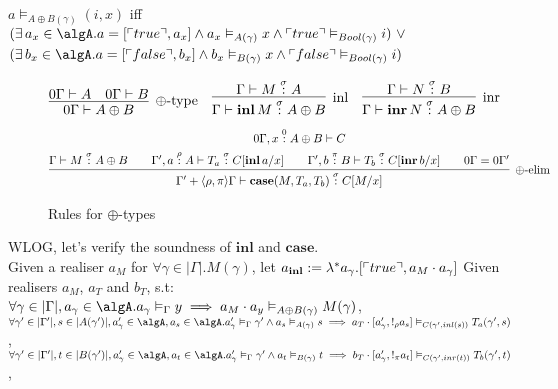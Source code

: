 \documentclass[12pt,a4paper]{article}
\begin{document}
$ a \vDash_{A \oplus B(\gamma)} (i , x)$ iff 
$\begin{aligned}
  &(\exists\, a_x \in \algA. a = [\ulcorner true \urcorner, a_x] \land a_x \vDash_{A(\gamma)} x \land \ulcorner true \urcorner \vDash_{Bool(\gamma)} i)\ \lor \\
  & (\exists\, b_x \in \algA. a = [\ulcorner false \urcorner, b_x] \land b_x \vDash_{B(\gamma)} x \land \ulcorner false \urcorner \vDash_{Bool(\gamma)} i) 
\end{aligned}$

\begin{figure}[h]
\begin{align*}
  \infer[\oplus\text{-type}]{0\Gamma \vdash A \oplus B}{
    0\Gamma \vdash A &
    0\Gamma \vdash B} & & 
  \infer[\text{inl}]{\Gamma \vdash \mathbf{inl}\, M \of \sigma A \oplus B}{
      \Gamma \vdash M \of{\sigma} A} & &
    \infer[\text{inr}]{\Gamma \vdash \mathbf{inr}\, N \of \sigma A \oplus B}{
      \Gamma \vdash N \of{\sigma} B
    }
  \end{align*}
  \begin{gather*}
  0\Gamma, x \of{0} A \oplus B \vdash C \\
  \infer[\oplus \text{-elim}]{\Gamma' + \langle\rho, \pi\rangle\Gamma \vdash \mathbf{case}(M, T_a, T_b) \of{\sigma} C[M / x]}{
    \Gamma \vdash M \of \sigma A \oplus B &&
    \Gamma', a \of {\rho} A \vdash T_a \of{\sigma} C[\mathbf{inl}\,a/x] && 
    \Gamma', b \of{\pi} B \vdash T_b \of{\sigma} C[\mathbf{inr}\, b/x] &&
    0\Gamma = 0\Gamma'
  }
  \end{gather*}
\caption{Rules for $\oplus$-types}
\end{figure}
WLOG, let's verify the soundness of $\mathbf{inl}$ and $\mathbf{case}$.\\
Given a realiser $a_M$ for $\forall \gamma \in |\Gamma|. M(\gamma)$, let $a_{\mathbf{inl}} := \lambda^* a_\gamma. [\ulcorner true \urcorner, a_M \cdot a_\gamma]$
\newpage
Given realisers $a_M$, $a_T$ and $b_T$, s.t:\\
$\forall \gamma \in |\Gamma|, a_\gamma \in \algA. a_\gamma \vDash_{\Gamma} y \implies a_M \cdot a_y \vDash_{A \oplus B (\gamma)} M(\gamma)$,\\
$\forall \gamma' \in |\Gamma'|, s \in |A(\gamma')|,  a'_\gamma \in \algA, a_s \in \algA. a'_\gamma \vDash_{\Gamma} \gamma' \land a_s \vDash_{A(\gamma)} s \implies a_T \cdot [a'_\gamma , !_\rho a_s] \vDash_{C(\gamma' , inl(s))} T_a(\gamma', s)$,\\
$\forall \gamma' \in |\Gamma'|, t \in |B(\gamma')|,  a'_\gamma \in \algA, a_t \in \algA. a'_\gamma \vDash_{\Gamma} \gamma' \land a_t \vDash_{B(\gamma)} t \implies b_T \cdot [a'_\gamma , !_\pi a_t] \vDash_{C(\gamma' , inr(t))} T_b(\gamma', t)$,\\
\end{document}
